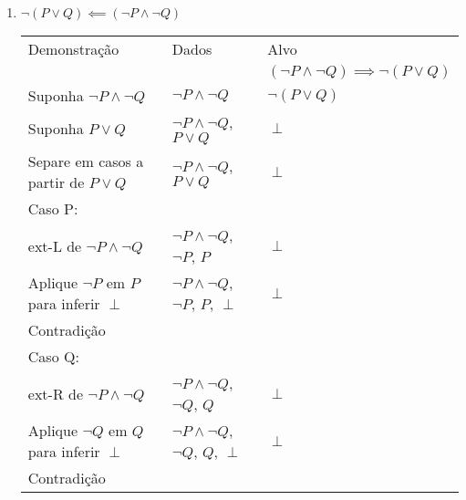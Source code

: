 \documentclass[a4paper, 12pt]{article}
\begin{document}
\begin{enumerate}
\begin{enumerate}[1.]
        \item $\neg (P \lor Q) \impliedby (\neg P \land \neg Q)$
        \begin{table}[h!]
            \centering
            \begin{tabular}{|p{4cm} | p{4cm} | p{4cm} |}
            \rowcolor{gray!50}
            Demonstração & Dados & Alvo \\
            & & $(\neg P \land \neg Q) \implies \neg (P \lor Q)$\\
            Suponha $\neg P \land \neg Q$ & $\neg P \land \neg Q$ & $\neg(P \lor Q)$ \\
            Suponha $P \lor Q$ & $\neg P \land \neg Q$, $P \lor Q$ & $\perp$ \\
            Separe em casos a partir de $P \lor Q$ & $\neg P \land \neg Q$, $P \lor Q$ & $\perp$ \\
            \hline
            Caso P: & & \\
            ext-L de $\neg P \land \neg Q$ & $\neg P \land \neg Q$, $\neg P$, $P$ & $\perp$ \\
            Aplique $\neg P$ em $P$ para inferir $\perp$ & $\neg P \land \neg Q$, $\neg P$, $P$, $\perp$ & $\perp$ \\
            Contradição & & \\
            \hline
            Caso Q: & & \\
            ext-R de $\neg P \land \neg Q$ & $\neg P \land \neg Q$, $\neg Q$, $Q$ & $\perp$ \\
            Aplique $\neg Q$ em $Q$ para inferir $\perp$ & $\neg P \land \neg Q$, $\neg Q$, $Q$, $\perp$ & $\perp$ \\
            Contradição & & \\
            \hline
            \end{tabular}
        \end{table}

    \end{enumerate}
\end{enumerate}
\end{document}
